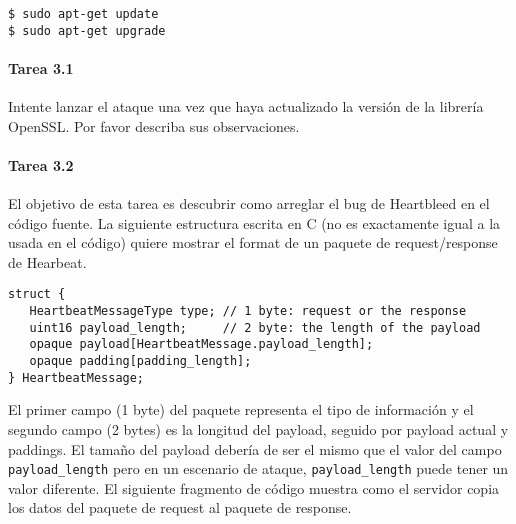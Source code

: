 \begin{lstlisting}
$ sudo apt-get update
$ sudo apt-get upgrade
\end{lstlisting}


\paragraph{Tarea 3.1} Intente lanzar el ataque una vez que haya actualizado la versión de la librería OpenSSL. Por favor describa sus observaciones.



\paragraph{Tarea 3.2} El objetivo de esta tarea es descubrir como arreglar el bug de Heartbleed en el código fuente. La siguiente estructura escrita en C (no es exactamente igual a la usada en el código) quiere mostrar el format de un paquete de request/response de Hearbeat.


\begin{lstlisting}
struct {
   HeartbeatMessageType type; // 1 byte: request or the response
   uint16 payload_length;     // 2 byte: the length of the payload
   opaque payload[HeartbeatMessage.payload_length]; 
   opaque padding[padding_length]; 
} HeartbeatMessage;
\end{lstlisting}

El primer campo (1 byte) del paquete representa el tipo de información y el segundo campo (2 bytes) es la longitud del payload, seguido por payload actual y paddings. El tamaño del payload debería de ser el mismo que el valor del campo \texttt{payload\_length} pero en un escenario de ataque, \texttt{payload\_length}  puede tener un valor diferente. El siguiente fragmento de código muestra como el servidor copia los datos del paquete de request al paquete de response.


